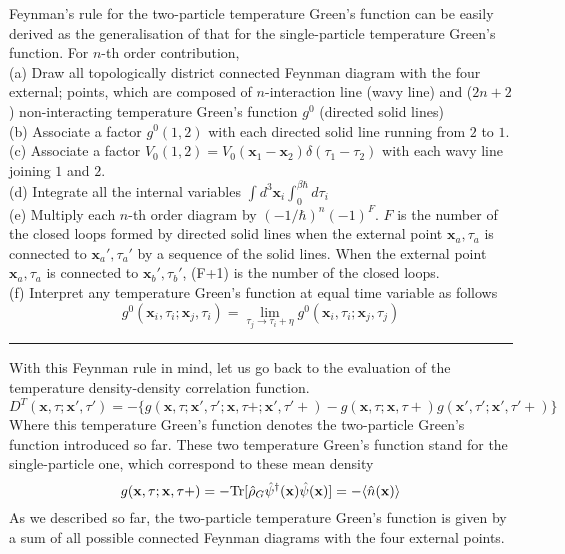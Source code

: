  Feynman's rule for the two-particle temperature Green's function can be easily derived as the generalisation of that for the single-particle temperature Green's function.
 For $n$-th order contribution,\\
(a) Draw all topologically district connected Feynman diagram with the four external; points, which are composed of $n$-interaction line (wavy line) and ($2n+2$) non-interacting temperature Green's function $g^0$ (directed solid lines)\\
(b) Associate a factor $g^0(1,2)$ with each directed solid line running from $2$ to $1$.\\
(c) Associate a factor $V_0(1,2)=V_0(\mathbf x_1-\mathbf x_2)\delta(\tau_1-\tau_2)$ with each wavy line joining $1$ and $2$.\\
(d) Integrate all the internal variables $\int d^3\mathbf x_i\int_0^{\beta\hbar}d\tau_i$\\
(e) Multiply each $n$-th order diagram by $(-1/\hbar)^n(-1)^F$. $F$ is the number of the closed loops formed by directed solid lines when the external point $\mathbf x_a,\tau_a$ is connected to $\mathbf x_a',\tau_a'$ by a sequence of the solid lines.
When the external point $\mathbf x_a,\tau_a$ is connected to $\mathbf x_b',\tau_b'$, (F+1) is the number of the closed loops.\\
(f) Interpret any temperature Green's function at equal time variable as follows 
\[
g^0(\mathbf x_i,\tau_i;\mathbf x_j,\tau_i)=\lim_{\tau_j\to \tau_i+\eta}g^0(\mathbf x_i,\tau_i;\mathbf x_j,\tau_j)
\]
\rule{\textwidth}{0.1mm}
With this Feynman rule in mind, let us go back to the evaluation of the temperature density-density correlation function.
\begin{equation}
D^T(\mathbf x,\tau;\mathbf x',\tau')=-\{ g(\mathbf x,\tau;\mathbf x',\tau';\mathbf x,\tau+;\mathbf x',\tau'+)-g(\mathbf x,\tau;\mathbf x,\tau+)g(\mathbf x',\tau';\mathbf x',\tau'+) \}
\end{equation}
 Where this temperature Green's function denotes the two-particle Green's function introduced so far.
 These two temperature Green's function stand for the single-particle one, which correspond to these mean density
\begin{equation}
g(\mathbf x,\tau;\mathbf x,\tau+)=-\text{Tr}[\hat \rho_G\hat \psi^\dag(\mathbf x)\hat \psi(\mathbf x)]=-\langle \hat n(\mathbf x)\rangle
\end{equation}
 As we described so far, the two-particle temperature Green's function is given by a sum of all possible connected Feynman diagrams with the four external points.\\

